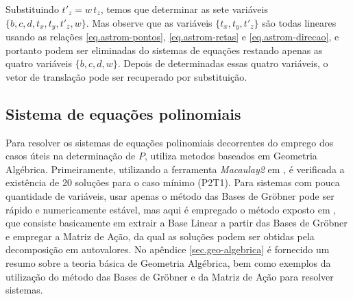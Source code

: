 Substituindo $t'_z=w\,t_z$, temos que determinar as sete variáveis $\{b,c,d,t_x,t_y,t'_z,w\}$. Mas observe que as variáveis $\{t_x,t_y,t'_z\}$ são todas lineares usando as relações \ref{eq.astrom-pontos}, \ref{eq.astrom-retas} e \ref{eq.astrom-direcao}, e portanto podem ser eliminadas do sistemas de equações restando apenas as quatro variáveis $\{b,c,d,w\}$. Depois de determinadas essas quatro variáveis, o vetor de translação pode ser recuperado por substituição. 

\subsection{Sistema de equações polinomiais}

Para resolver os sistemas de equações polinomiais decorrentes do emprego dos casos úteis na determinação de $P$, \citep{bib:kuang} utiliza metodos baseados em Geometria Algébrica. Primeiramente, utilizando a ferramenta {\it Macaulay2} em \citep{macaulay2}, é verificada a existência de 20 soluções para o caso mínimo (P2T1). Para sistemas com pouca quantidade de variáveis, usar apenas o método das Bases de Gr\"obner pode ser rápido e numericamente estável, mas aqui é empregado o método exposto em \citep{byrod}, que consiste basicamente em extrair a Base Linear a partir das Bases de Gr\"obner e empregar a Matriz de Ação, da qual as soluções podem ser obtidas pela decomposição em autovalores. No apêndice \ref{sec.geo-algebrica} é fornecido um resumo sobre a teoria básica de Geometria Algébrica, bem como exemplos da utilização do método das Bases de Gr\"obner e da Matriz de Ação para resolver sistemas.




